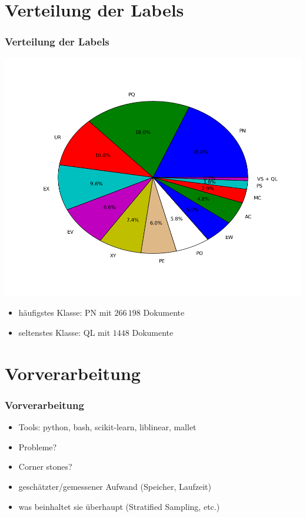 \documentclass[12pt, xcolor=table]{beamer}
\begin{document}
\section{Verteilung der Labels}
\begin{frame}
    \frametitle{Verteilung der Labels}
    \begin{center}
        \includegraphics[scale=0.3]{figures/labels.png}
    \end{center}
    \begin{itemize}
        \item häufigstes Klasse: PN mit $266\, 198$ Dokumente
        \item seltenstes Klasse: QL mit $1448$ Dokumente
    \end{itemize}
\end{frame}

\section{Vorverarbeitung}
\begin{frame}
    \frametitle{Vorverarbeitung}
    \begin{itemize}
        \item  Tools: python, bash, scikit-learn, liblinear, mallet
        \item  Probleme?
        \item  Corner stones?
        \item  geschätzter/gemessener Aufwand (Speicher, Laufzeit)
        \item  was beinhaltet sie überhaupt (Stratified Sampling, etc.)
    \end{itemize}
\end{frame}
\end{document}
